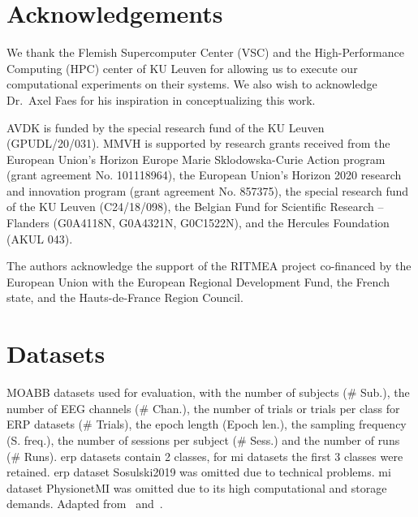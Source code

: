 \documentclass[twocolumn]{article}
\begin{document}
\section*{Acknowledgements}
We thank the Flemish Supercomputer Center (VSC) and the High-Performance
Computing (HPC) center of KU Leuven for allowing us to execute our
computational experiments on their systems.
We also wish to acknowledge Dr.\ Axel Faes for his inspiration in
conceptualizing this work.

AVDK is funded by the special research fund of the KU Leuven (GPUDL/20/031).
MMVH is supported by research grants received from the European Union’s
Horizon Europe Marie Sklodowska-Curie Action program
(grant agreement No. 101118964), the European Union’s Horizon 2020 research and
innovation program (grant agreement No. 857375), the special research fund of
the KU Leuven (C24/18/098), the Belgian Fund for Scientific Research – Flanders
(G0A4118N, G0A4321N, G0C1522N), and the Hercules Foundation (AKUL 043).

The authors acknowledge the support of the RITMEA project co-financed by the
European Union with the European Regional Development Fund, the French state,
and the Hauts-de-France Region Council.


\printbibliography%
\clearpage%

\appendix
\setcounter{table}{0}
\renewcommand{\thetable}{\thesection\arabic{table}}



\onecolumn

\section{Datasets}

\begin{table*}[!htbp]
	\footnotesize
	
	\caption{MOABB datasets used for evaluation, with the number of
		subjects (\# Sub.), the number of EEG channels (\# Chan.), the number of trials or trials per class for ERP
		datasets (\# Trials), the epoch length (Epoch len.), the sampling
		frequency (S. freq.), the number of sessions per subject (\# Sess.) and the
		number of runs (\# Runs). \ac{erp} datasets contain 2 classes, for \ac{mi} datasets the first 3 classes were retained. \Ac{erp} dataset Sosulski2019 was omitted due to technical problems.
		\Ac{mi} dataset PhysionetMI was omitted due to its high computational and
		storage demands.
		Adapted from~\cite{Aristimunha2023}
		and~\cite{Chevallier2024}.}%
	\label{tab:moabb}
\end{table*}
\end{document}
